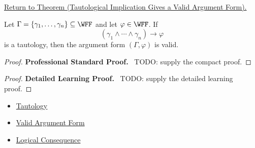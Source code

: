 \newpage
{}
\label{prf:tautological-implication-valid-argument-form-propositional-logic}

\begin{remark*}[Return]
\hyperref[thm:tautological-implication-valid-argument-form-propositional-logic]{Return to Theorem (Tautological Implication Gives a Valid Argument Form).}
\end{remark*}

\begin{theorem*}
Let \(\Gamma=\{\gamma_1,\ldots,\gamma_n\}\subseteq\WFF\) and let
\(\varphi\in\WFF\). If
\[
(\gamma_1\land\cdots\land\gamma_n)\to\varphi
\]
is a tautology, then the argument form \((\Gamma,\varphi)\) is valid.
\end{theorem*}

\begin{proof}
\textbf{Professional Standard Proof.}~
TODO: supply the compact proof.
\end{proof}

\begin{proof}
\textbf{Detailed Learning Proof.}~
TODO: supply the detailed learning proof.
\end{proof}

\begin{remark*}
\end{remark*}

\begin{dependencies}
\begin{itemize}
  \item \hyperref[def:tautology-propositional-logic]{Tautology}
  \item \hyperref[def:valid-argument-form-propositional-logic]{Valid Argument Form}
  \item \hyperref[def:logical-consequence-propositional-logic]{Logical Consequence}
\end{itemize}
\end{dependencies}

\clearpage
